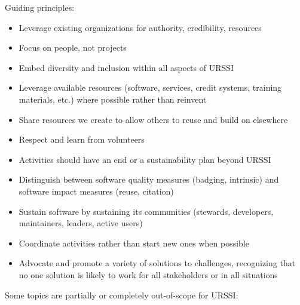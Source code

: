 \documentclass[
]{book}
\begin{document}
Guiding principles:

\begin{itemize}
\item
  Leverage existing organizations for authority, credibility, resources
\item
  Focus on people, not projects
\item
  Embed diversity and inclusion within all aspects of URSSI
\item
  Leverage available resources (software, services, credit systems, training
  materials, etc.) where possible rather than reinvent
\item
  Share resources we create to allow others to reuse and build on elsewhere
\item
  Respect and learn from volunteers
\item
  Activities should have an end or a sustainability plan beyond URSSI
\item
  Distinguish between software quality measures (badging, intrinsic) and software impact measures (reuse, citation)
\item
  Sustain software by sustaining its communities (stewards, developers, maintainers,
  leaders, active users)
\item
  Coordinate activities rather than start new ones when possible
\item
  Advocate and promote a variety of solutions to challenges, recognizing that no one
  solution is likely to work for all stakeholders or in all situations
\end{itemize}

Some topics are partially or completely out-of-scope for URSSI:
\end{document}
